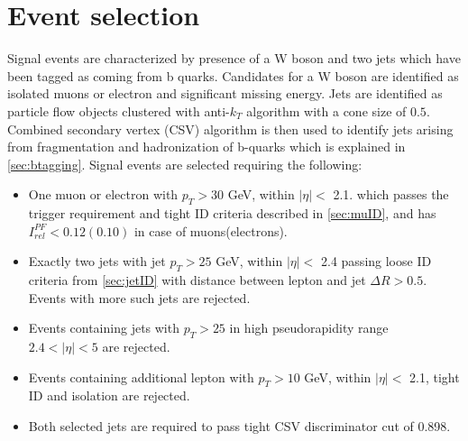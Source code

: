 
\section{Event selection}
\label{sec:selection}
Signal events are characterized by presence of a W boson and two jets which have been tagged as coming from b quarks. 
Candidates for a W boson are identified as isolated muons or electron and significant missing energy. 
Jets are identified as particle flow objects clustered with anti-$k_T$ algorithm with a cone size of $0.5$.
Combined secondary vertex (CSV) algorithm is then used to identify jets arising from fragmentation and hadronization of b-quarks which is explained in \ref{sec:btagging}. Signal events are selected requiring the following:
\begin{itemize}
\item One muon or electron with $p_T>30$ GeV, within $|\eta|<$ 2.1. which passes the trigger requirement and tight ID criteria described in \ref{sec:muID}, and has $I_{rel}^{PF}<0.12(0.10)$ in case of muons(electrons).
\item Exactly two jets with jet $p_T>25$ GeV, within $|\eta|<$ 2.4 passing loose ID criteria from \ref{sec:jetID} with distance between lepton and jet $\Delta R>0.5$. Events with more such jets are rejected.
\item Events containing jets with $p_T>25$ in high pseudorapidity range $2.4<|\eta|<5$ are rejected.
\item Events containing additional lepton with $p_T>10$ GeV, within $|\eta|<$ 2.1, tight ID and isolation are rejected.
\item Both selected jets are required to pass tight CSV discriminator cut of 0.898.
\end{itemize} 

